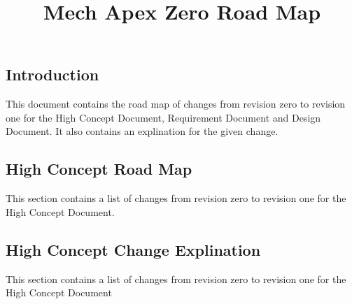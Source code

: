 \documentclass[]{article}
\title{Mech Apex Zero Road Map}
\author{}
\begin{document}
\maketitle
\subsection*{Introduction}
This document contains the road map of changes from revision zero to revision one for the High Concept Document, Requirement Document and Design Document. It also  contains an explination for the given change.
\subsection*{High Concept Road Map}
This section contains a list of changes from revision zero to revision one for the High Concept Document.

\subsection*{High Concept Change Explination}
This section contains a list of changes from revision zero to revision one for the High Concept Document
\end{document}
